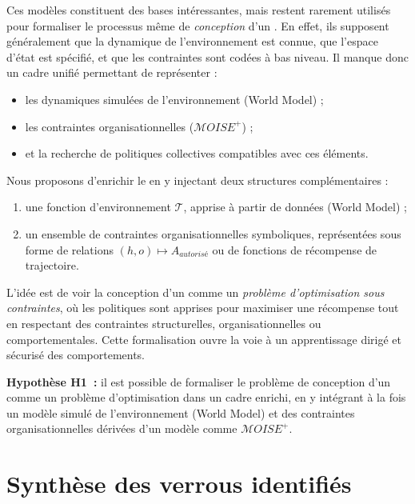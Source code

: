 \noindent
Ces modèles constituent des bases intéressantes, mais restent rarement utilisés pour formaliser le processus même de \textit{conception} d'un . En effet, ils supposent généralement que la dynamique de l'environnement est connue, que l'espace d'état est spécifié, et que les contraintes sont codées à bas niveau. Il manque donc un cadre unifié permettant de représenter :
\begin{itemize}
    \item les dynamiques simulées de l'environnement (World Model) ;
    \item les contraintes organisationnelles ($\mathcal{M}OISE^+$) ;
    \item et la recherche de politiques collectives compatibles avec ces éléments.
\end{itemize}

\medskip

\noindent
Nous proposons d'enrichir le  en y injectant deux structures complémentaires :
\begin{enumerate}
    \item une fonction d'environnement $\mathcal{T}$, apprise à partir de données (World Model) ;
    \item un ensemble de contraintes organisationnelles symboliques, représentées sous forme de relations $(h, o) \mapsto A_{autorisé}$ ou de fonctions de récompense de trajectoire.
\end{enumerate}

\noindent
L'idée est de voir la conception d'un  comme un \textit{problème d'optimisation sous contraintes}, où les politiques sont apprises pour maximiser une récompense tout en respectant des contraintes structurelles, organisationnelles ou comportementales. Cette formalisation ouvre la voie à un apprentissage dirigé et sécurisé des comportements.

\medskip

\noindent
\textbf{Hypothèse H1~:} il est possible de formaliser le problème de conception d'un  comme un problème d'optimisation dans un cadre  enrichi, en y intégrant à la fois un modèle simulé de l'environnement (World Model) et des contraintes organisationnelles dérivées d'un modèle comme $\mathcal{M}OISE^+$.

\section*{Synthèse des verrous identifiés}


